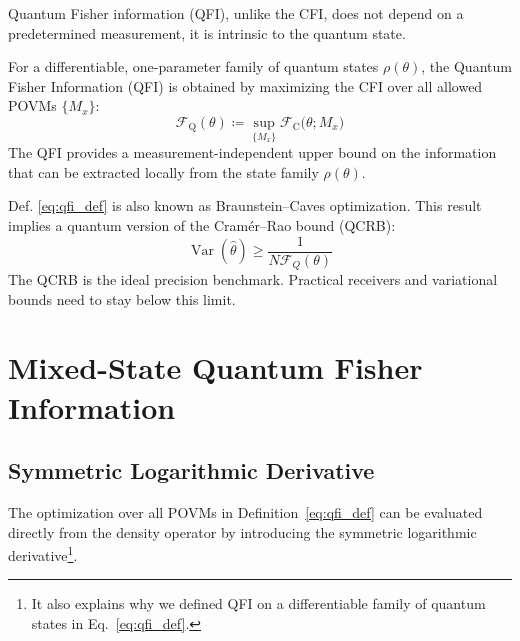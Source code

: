 Quantum Fisher information (QFI), unlike the CFI, does not depend on a predetermined measurement, it is intrinsic to the quantum state.

\begin{definition}
    For a differentiable, one-parameter family of quantum states $\rho(\theta)$, the Quantum Fisher Information (QFI) is obtained by maximizing the CFI over all allowed POVMs $\{M_x\}$:
    \begin{equation}
        \mathcal{F}_{\mathrm{Q}}(\theta)
        \coloneqq
        \sup_{\{M_x\}}
        \mathcal{F}_{\mathrm{C}}
        \bigl(\theta;{M_x}\bigr)
        \label{eq:qfi_def}
    \end{equation}
    \faLightbulb \hspace{5pt} The QFI provides a measurement-independent upper bound on the information that can be extracted locally from the state family $\rho(\theta)$.
\end{definition}

\begin{remark}
    Def. \ref{eq:qfi_def} is also known as Braunstein–Caves optimization.
    This result implies a quantum version of the Cramér--Rao bound (QCRB):
    \begin{equation}
        \operatorname{Var}(\hat{\theta})
        \geq\frac{1}{N\mathcal{F}_Q(\theta)}
        \label{eq:qcrb}
    \end{equation}
    The QCRB is the ideal precision benchmark. Practical receivers and variational bounds need to stay below this limit.
\end{remark}

\section{Mixed-State Quantum Fisher Information}

\subsection{Symmetric Logarithmic Derivative}

The optimization over all POVMs in Definition~\ref{eq:qfi_def} can be evaluated directly from the density operator by introducing the symmetric logarithmic derivative\footnote{It also explains why we defined QFI on a differentiable family of quantum states in Eq.~\eqref{eq:qfi_def}.}.

